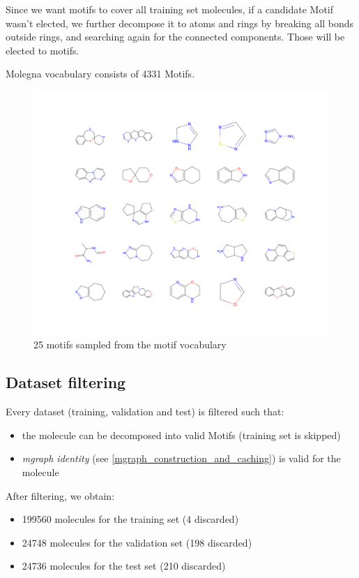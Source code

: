 \documentclass{article}
\begin{document}
Since we want motifs to cover all training set molecules, if a candidate Motif wasn't elected, we further decompose
it to atoms and rings by breaking all bonds outside rings, and searching again for the connected components.
Those will be elected to motifs.

Molegna vocabulary consists of 4331 Motifs.

\begin{figure}[h]
\centering
\includegraphics[width=1.2\linewidth]{./img/motifvocab.png}
\caption{
25 motifs sampled from the motif vocabulary}
\end{figure}

\subsection{Dataset filtering}

Every dataset (training, validation and test) is filtered such that:
\begin{itemize}
    \item the molecule can be decomposed into valid Motifs (training set is skipped)
    \item \textit{mgraph identity} (see \ref{mgraph_construction_and_caching}) is valid for the molecule
\end{itemize}

After filtering, we obtain:
\begin{itemize}
    \item 199560 molecules for the training set (4 discarded)
    \item 24748 molecules for the validation set (198 discarded)
    \item 24736 molecules for the test set (210 discarded)
\end{itemize}
\end{document}
